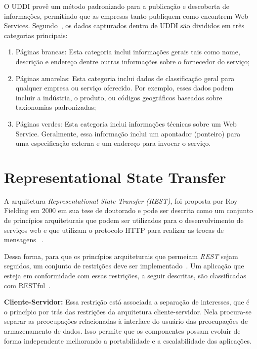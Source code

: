 O UDDI provê um método padronizado para a publicação e descoberta de informações, permitindo que as empresas tanto publiquem como encontrem Web Services. Segundo~\cite{Cerami2002}, os dados capturados dentro de UDDI são divididos em três categorias principais:

\begin{enumerate}[a )]
	\item Páginas brancas: Esta categoria inclui informações gerais tais como nome, descrição e endereço dentre outras informações sobre o fornecedor do serviço;

	\item Páginas amarelas: Esta categoria inclui dados de classificação geral para qualquer empresa ou serviço oferecido. Por exemplo, esses dados podem incluir a indústria, o produto, ou códigos geográficos baseados sobre taxionomias padronizadas;

	\item Páginas verdes: Esta categoria inclui informações técnicas sobre um Web Service. Geralmente, essa informação inclui um apontador (ponteiro) para uma especificação externa e um endereço para invocar o serviço.

\end{enumerate}

\section{Representational State Transfer}\label{sec:rest}
A arquitetura \emph{Representational State Transfer (REST)}, foi proposta por Roy Fielding em
2000 em sua tese de doutorado e pode ser descrita como um conjunto de princípios arquiteturais que podem ser utilizados para o desenvolvimento de serviços web e que utilizam o protocolo HTTP para realizar as trocas de mensagens ~\cite{ Fielding2000}.

Dessa forma, para que os princípios arquiteturais que permeiam \emph{REST} sejam seguidos, um conjunto de restrições deve ser implementado~\cite{ Fielding2000}. Um aplicação que esteja em conformidade com essas restrições, a seguir descritas, são classificadas com RESTful~\cite{Richardson2007}.

\textbf{Cliente-Servidor:} Essa restrição está associada a separação de interesses, que é o princípio por trás das restrições da arquitetura cliente-servidor. Nela procura-se separar as preocupações relacionadas à interface do usuário das preocupações de armazenamento de dados. Isso permite que os componentes possam evoluir de forma independente melhorando a portabilidade e a escalabilidade das aplicações.

